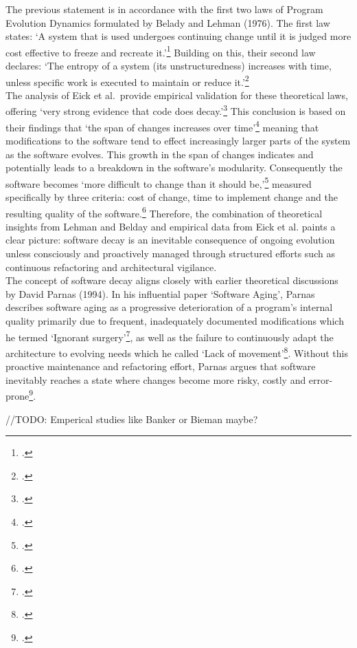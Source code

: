 The previous statement is in accordance with the first two laws of Program Evolution Dynamics formulated by Belady and Lehman (1976).
The first law states: `A system that is used undergoes continuing change until it is judged more cost effective to freeze and recreate it.'\footcite[228]{beladyModelLargeProgram1976}
Building on this, their second law declares: `The entropy of a system (its unstructuredness) increases with time, unless specific work is executed to maintain or reduce it.'\footcite[228]{beladyModelLargeProgram1976}\\

The analysis of Eick et al.\ provide empirical validation for these theoretical laws, offering `very strong evidence that code does decay.'\footcite[7]{eickDoesCodeDecay2001}
This conclusion is based on their findings that `the span of changes increases over time'\footcite[7]{eickDoesCodeDecay2001} meaning that modifications to the software tend to effect increasingly larger parts of the system as the software evolves. This growth in the span of changes indicates and potentially leads to
a breakdown in the software's modularity. Consequently the software becomes `more difficult to change than it should be,'\footcite[3]{eickDoesCodeDecay2001} measured specifically by three criteria: cost of change, time to implement change and the resulting quality of the software.\footcite[3]{eickDoesCodeDecay2001}
Therefore, the combination of theoretical insights from Lehman and Belday and empirical data from Eick et al. paints a clear picture: software decay is an inevitable consequence of ongoing evolution unless consciously and proactively managed through structured efforts such as continuous refactoring and architectural vigilance.\\

The concept of software decay aligns closely with earlier theoretical discussions by David Parnas (1994). In his influential paper `Software Aging', Parnas describes software aging as a progressive deterioration of a program's internal quality primarily due to frequent, 
inadequately documented modifications which he termed `Ignorant surgery'\footcite[280]{296790}, as well as the failure to continuously adapt the architecture to evolving needs which he called `Lack of movement'\footcite[280]{296790}.
Without this proactive maintenance and refactoring effort, Parnas argues that software inevitably reaches a state where changes become more risky, costly and error-prone\footcite[280-281]{296790}.

//TODO: Emperical studies like Banker or Bieman maybe?

